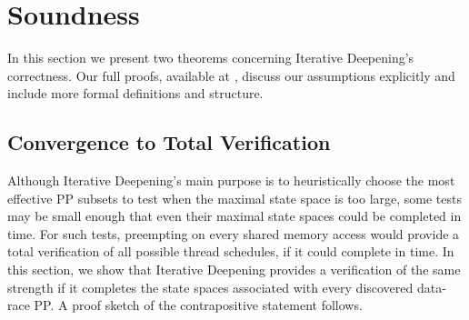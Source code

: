\section{Soundness}
\label{sec:soundness}

In this section we present two theorems concerning Iterative Deepening's correctness.
Our full proofs,
available at \cite{quicksand-soundness},
discuss our assumptions explicitly and include more formal definitions and structure.


\renewcommand\proofname{Proof Sketch}


\subsection{Convergence to Total Verification}
\label{sec:totalverif}

Although Iterative Deepening's main purpose is to heuristically choose the most effective PP subsets to test
when the maximal state space is too large,
some tests may be small enough that even their maximal state spaces could be completed in time.
For such tests, preempting on every shared memory access \cite{spin,inspect} would provide a total verification of all possible thread schedules, if it could complete in time.
In this section, we show that Iterative Deepening provides a verification of the same strength if it completes the state spaces associated with every discovered data-race PP.
A proof sketch of the contrapositive statement follows.

